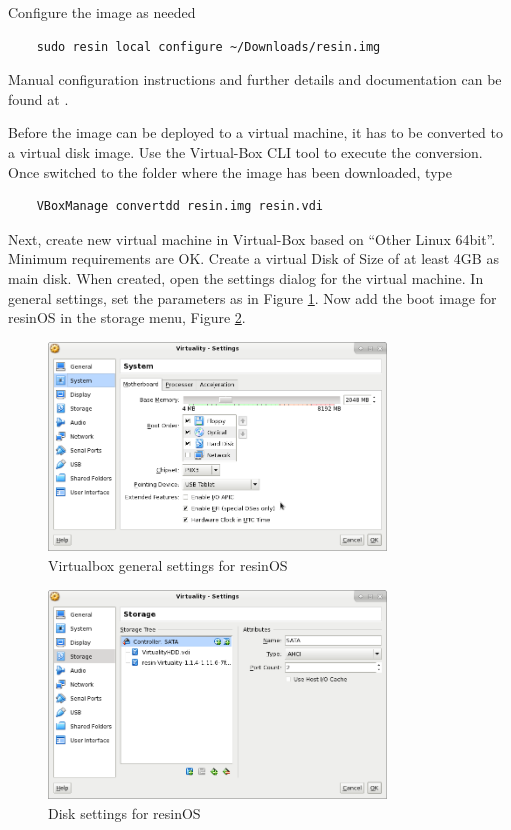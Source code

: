 \documentclass[]{scrartcl}
\begin{document}
Configure the image as needed
\begin{verbatim}
	sudo resin local configure ~/Downloads/resin.img
\end{verbatim}

Manual configuration instructions and further details and documentation can be found at \cite{resin02}.
 
Before the image can be deployed to a virtual machine, it has to be converted to a virtual disk image. 
Use the Virtual-Box CLI tool to execute the conversion. Once switched to the folder where the image has been downloaded, type
\begin{verbatim}
	VBoxManage convertdd resin.img resin.vdi
\end{verbatim}

Next, create new virtual machine in Virtual-Box based on ``Other Linux 64bit''. Minimum requirements are OK. Create a virtual Disk of Size of at least 4GB as main disk. 
When created, open the settings dialog for the virtual machine. In general settings, set the parameters as in Figure \ref{fig:resingen}. Now add the boot image for resinOS in the storage menu, Figure \ref{fig:resindisk}.

\begin{figure}[t]
	\centering
	\includegraphics[width=0.8\textwidth]{resin-vbox}
	\caption{Virtualbox general settings for resinOS}
	\label{fig:resingen}
\end{figure}

\begin{figure}[t]
	\centering
	\includegraphics[width=0.8\textwidth]{resin-vbox2}
	\caption{Disk settings for resinOS}
	\label{fig:resindisk}
\end{figure}
\end{document}
